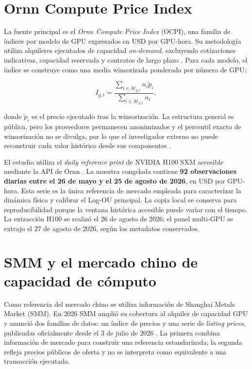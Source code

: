 \section{Ornn Compute Price Index}
\label{sec:ornn}

La fuente principal es el \textit{Ornn Compute Price Index} (OCPI), una familia de
índices por modelo de GPU expresados en USD por GPU-hora. Su metodología utiliza
alquileres ejecutados de capacidad \textit{on-demand}, excluyendo cotizaciones
indicativas, capacidad reservada y contratos de largo plazo
\parencite{ornn_methodology_2026}. Para cada modelo, el índice se construye como
una media winsorizada ponderada por número de GPU:

\begin{equation}
    I_{g,t}
    =
    \frac{\sum_{i\in\mathcal{M}_{g,t}}n_i\widetilde p_i}
         {\sum_{i\in\mathcal{M}_{g,t}}n_i},
    \label{eq:ornn_index}
\end{equation}

donde $\widetilde p_i$ es el precio ejecutado tras la winsorización. La estructura
general es pública, pero los proveedores permanecen anonimizados y el percentil
exacto de winsorización no se divulga, por lo que el investigador externo no puede
reconstruir cada valor histórico desde sus componentes
\parencite{ornn_methodology_2026}.

El estudio utiliza el \textit{daily reference print} de NVIDIA H100 SXM accesible
mediante la API de Ornn \parencite{ornn_api_2026,ornn_faq_2026}. La muestra
congelada contiene \textbf{92 observaciones diarias entre el 26 de mayo y el 25 de
agosto de 2026}, en USD por GPU-hora. Esta serie es la única referencia de mercado
empleada para caracterizar la dinámica física y calibrar el Log-OU principal. La
copia local se conserva para reproducibilidad porque la ventana histórica accesible
puede variar con el tiempo. La extracción H100 se realizó el 26 de agosto de 2026;
el panel multi-GPU se extrajo el 27 de agosto de 2026, según los metadatos conservados.

\section{SMM y el mercado chino de capacidad de cómputo}
\label{sec:smm_china}

Como referencia del mercado chino se utiliza información de Shanghai Metals
Market (SMM). En 2026 SMM amplió su cobertura al alquiler de capacidad GPU y
anunció dos familias de datos: un índice de precios y una serie de
\textit{listing prices}, publicadas oficialmente desde el 3 de julio de 2026
\parencite{smm_compute_launch_2026}. La primera combina información de mercado
para construir una referencia estandarizada; la segunda refleja precios públicos
de oferta y no se interpreta como equivalente a una transacción ejecutada.

